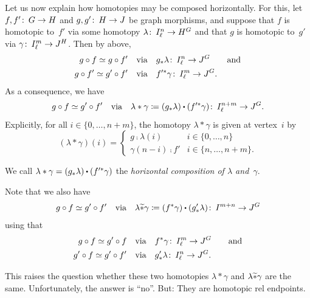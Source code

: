\documentclass[11pt,a4paper]{article}
\begin{document}
	Let us now explain how homotopies may be composed horizontally.
	For this, let $f,f'\colon\thinspace G\to H$ and $g,g'\colon\thinspace H\to J$ be graph morphisms, and suppose that $f$ is homotopic to~$f'$ via some homotopy $\lambda\colon\thinspace I^n_\ell\to H^G$ and that $g$ is homotopic to~$g'$ via $\gamma\colon\thinspace I^m_\ell\to J^H$.
	Then by above,
		\begin{align*}
			g\mathbin{\circ} f\simeq g\mathbin{\circ} f' \quad &\textup{via} \quad g_\ast\lambda\colon\thinspace I^n_\ell\to J^G \qquad \textup{and} \\
			g\mathbin{\circ} f'\simeq g'\mathbin{\circ} f' \quad &\textup{via} \quad f'^\ast\gamma\colon\thinspace I^m_\ell\to J^G.
		\end{align*}
	As a consequence, we have
		\begin{equation*}
			g\comp f\simeq g'\comp f' \quad \textup{via} \quad \lambda\ast\gamma\coloneqq (g_\ast\lambda)\bigcdot(f'^\ast\gamma)\co I^{n+m}_\ell\to J^G.
		\end{equation*}
	Explicitly, for all $i\in\{0,\dots,n+m\}$, the homotopy $\lambda\ast\gamma$ is given at vertex~$i$ by
		\begin{equation*}
			(\lambda\ast\gamma)(i) = \begin{cases}
				g\comp\lambda(i) & i\in\{0,\dots,n\} \\
				\gamma(n-i)\comp f' & i\in\{n,\dots,n+m\}.
			\end{cases}			
		\end{equation*}

	\begin{defi}
		We call $\lambda\ast\gamma = (g_\ast\lambda)\bigcdot(f'^\ast\gamma)$ the \textit{horizontal composition of $\lambda$ and~$\gamma$}.
	\end{defi}

	Note that we also have
		\begin{equation*}
			g\comp f\simeq g'\comp f' \quad \textup{via} \quad \lambda\wt{\ast}\gamma\coloneqq (f^\ast\gamma)\bigcdot(g'_\ast\lambda)\co I^{m+n}\to J^G
		\end{equation*}
		using that
		\begin{align*}
			g\mathbin{\circ} f\simeq g'\mathbin{\circ} f \quad &\textup{via} \quad f^\ast\gamma\colon\thinspace I^m_\ell\to J^G \qquad \textup{and} \\
			g'\mathbin{\circ} f\simeq g'\mathbin{\circ} f' \quad &\textup{via} \quad g'_\ast\lambda\colon\thinspace I^n_\ell\to J^G.
		\end{align*}

	\noindent This raises the question whether these two homotopies $\lambda\ast\gamma$ and $\lambda\widetilde{\ast}\gamma$ are the same. Unfortunately, the answer is ``no''. But: They are homotopic rel endpoints.
\end{document}
